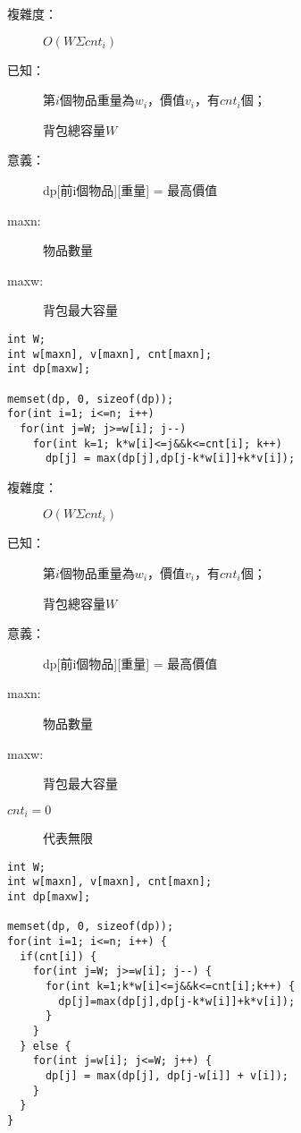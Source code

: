 \begin{center}
  \underline{  \bf{}  }
\end{center}
\begin{description}
  \item[複雜度：] $O(W\Sigma cnt_i)$
  \item[已知：] 第$i$個物品重量為$w_i$，價值$v_i$，有$cnt_i$個；\par
                背包總容量$W$
  \item[意義：] dp[前i個物品][重量] = 最高價值
  \item[maxn:] 物品數量
  \item[maxw:] 背包最大容量
\end{description}
\begin{lstlisting}
int W;
int w[maxn], v[maxn], cnt[maxn];
int dp[maxw];

memset(dp, 0, sizeof(dp));
for(int i=1; i<=n; i++)
  for(int j=W; j>=w[i]; j--)
    for(int k=1; k*w[i]<=j&&k<=cnt[i]; k++)
      dp[j] = max(dp[j],dp[j-k*w[i]]+k*v[i]);
\end{lstlisting}

\begin{center}
  \underline{  \bf{}  }
\end{center}
\begin{description}
  \item[複雜度：] $O(W\Sigma cnt_i)$
  \item[已知：] 第$i$個物品重量為$w_i$，價值$v_i$，有$cnt_i$個；\par
                背包總容量$W$
  \item[意義：] dp[前i個物品][重量] = 最高價值
  \item[maxn:] 物品數量
  \item[maxw:] 背包最大容量
  \item[$cnt_i=0$] 代表無限 
\end{description}
\begin{lstlisting}
int W;
int w[maxn], v[maxn], cnt[maxn];
int dp[maxw];

memset(dp, 0, sizeof(dp));
for(int i=1; i<=n; i++) {
  if(cnt[i]) {
    for(int j=W; j>=w[i]; j--) {
      for(int k=1;k*w[i]<=j&&k<=cnt[i];k++) {
        dp[j]=max(dp[j],dp[j-k*w[i]]+k*v[i]);
      }
    }
  } else {
    for(int j=w[i]; j<=W; j++) {
      dp[j] = max(dp[j], dp[j-w[i]] + v[i]);
    }
  }
}
\end{lstlisting}

